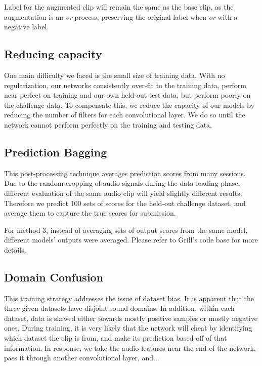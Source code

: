 \documentclass[10pt,twocolumn,letterpaper]{article}
\begin{document}
Label for the augmented clip will remain the same as the base clip, as the
augmentation is an \textit{or} process, preserving the original label when 
\textit{or} with a negative label.

\subsection{Reducing capacity}

One main difficulty we faced is the small size of training data. With no
regularization, our networks consistently over-fit to the training data,
perform near perfect on training and our own held-out test data, but
perform poorly on the challenge data. To compensate this, we reduce the
capacity of our models by reducing the number of filters for each
convolutional layer. We do so until the network cannot perform perfectly on
the training and testing data.

\subsection{Prediction Bagging}

This post-processing technique averages prediction scores from many
sessions. Due to the random cropping of audio signals during the data
loading phase, different evaluation of the same audio clip will yield
slightly different results. Therefore we predict 100 sets of scores for the
held-out challenge dataset, and average them to capture the true scores for
submission.

For method 3, instead of averaging sets of output scores from the same
model, different models' outputs were averaged. Please refer to Grill's
code base\cite{winning_blog} for more details.

\subsection{Domain Confusion}


This training strategy addresses the issue of dataset bias. It is apparent
that the three given datasets have disjoint sound domains. In addition,
within each dataset, data is skewed either towards mostly positive samples
or mostly negative ones. During training, it is very likely that the
network will cheat by identifying which dataset the clip is from, and make
its prediction based off of that information. In response, we take the
audio features near the end of the network, pass it through another
convolutional layer, and... 
\end{document}
